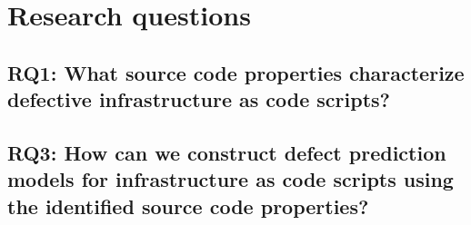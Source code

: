 
\section{Research questions}
\subsection{RQ1: What source code properties characterize defective infrastructure as code scripts?}
\subsection{RQ3: How can we construct defect prediction models for 
infrastructure as code scripts using the identified source code properties?}

